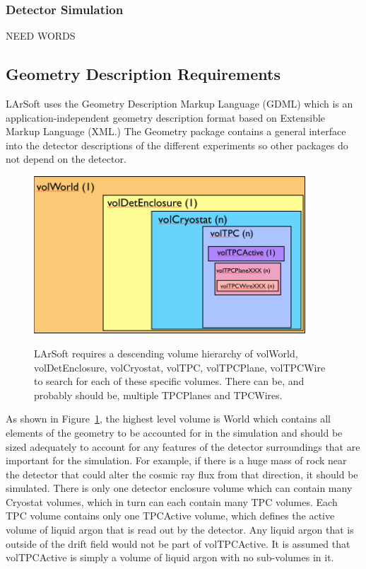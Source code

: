 \documentclass[12pt]{elsarticle}
\begin{document}
\subsubsection{Detector Simulation}
NEED WORDS

\subsection{Geometry Description Requirements}
LArSoft uses the Geometry Description Markup Language (GDML) which is an application-independent geometry description format based on Extensible Markup Language (XML.) 
The Geometry package contains a general interface into the detector descriptions of the different experiments so other packages do not depend on the detector. 

\begin{figure}[h]
\center
\caption{LArSoft requires a descending volume hierarchy of volWorld, volDetEnclosure, volCryostat, volTPC, volTPCPlane, volTPCWire to search for each of these specific volumes. There can be, and probably should be, multiple TPCPlanes and TPCWires.}
\includegraphics[width=4.0in]{./imgs/geometry_volumes.png}
\label{geo-vol.img}
\end{figure}

As shown in Figure~\ref{geo-vol.img},
the highest level volume is World which contains all elements of the geometry to be accounted for in the simulation and should be sized adequately to account for any features of the detector surroundings that are important for the simulation. For example, if there is a huge mass of rock near the detector that could alter the cosmic ray flux from that direction, it should be simulated. There is only one detector enclosure volume which can contain many Cryostat volumes, which in turn can each contain many TPC volumes. Each TPC volume contains only one TPCActive volume, which defines the active volume of liquid argon that is read out by the detector. Any liquid argon that is outside of the drift field would not be part of volTPCActive. It is assumed that volTPCActive is simply a volume of liquid argon with no sub-volumes in it. 
\end{document}
